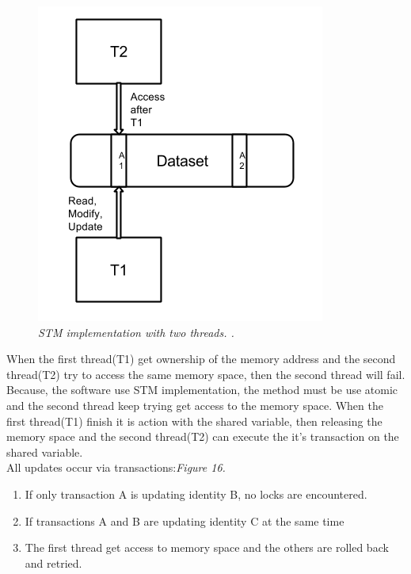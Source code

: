 \documentclass[12pt]{article}
\begin{document}
\begin{figure}[h!]
\centering
\includegraphics[scale=0.25]{Pictures/STMtwoThreads.png}
\caption{\textit{\color{gray}STM implementation with two threads. \cite{Dennis}.}}
\end{figure}


When the first thread(T1) get ownership of the memory address and the second thread(T2) try to access the same memory space, then the second thread will fail. Because, the software use STM implementation, the method must be use atomic and the second thread keep trying get access to the memory space. When the first thread(T1) finish it is action with the shared variable, then releasing the memory space and the second thread(T2) can execute the it's transaction on the shared variable.\cite{Dennis} \\


{\setlength{\parindent}{0cm}
All updates occur via transactions:\cite{Kenneth}\textit{\color{gray}Figure 16.}}
\begin{enumerate}
\item If only transaction A is updating identity B, no locks are encountered.   
\item If transactions A and B are updating identity C at the same time
\item The first thread get access to memory space and the others are rolled back and retried.
\end{enumerate}
\end{document}
